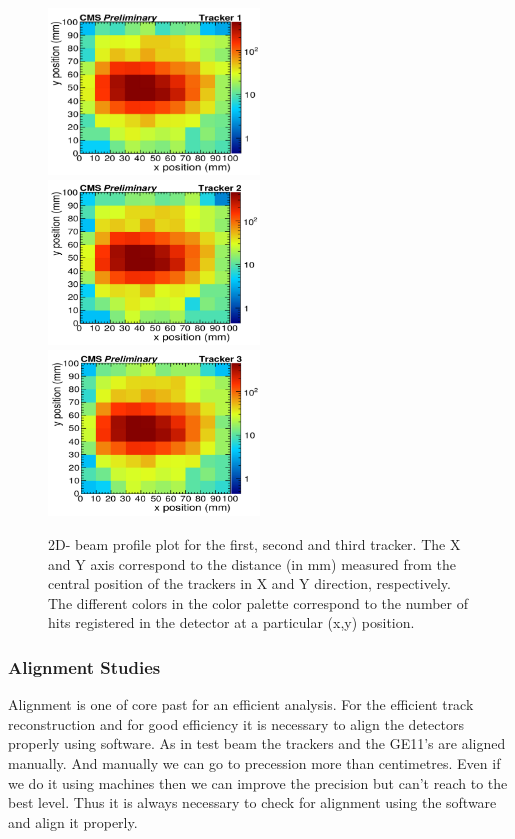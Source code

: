 \begin{figure}[!htbp]
\centering
\includegraphics[width=0.5\textwidth]{figures/GEM/Selection_027.png}%
\includegraphics[width=0.5\textwidth]{figures/GEM/Selection_028.png}\\
\includegraphics[width=0.5\textwidth]{figures/GEM/Selection_029.png}
\caption{2D- beam profile plot for the first, second and third tracker. The X and Y axis correspond to the distance (in mm) measured from the central position of the trackers in X and Y direction, respectively. The different colors in the color palette correspond to the number of hits registered in the detector at a particular (x,y) position.}\label{BeamProfile}
\end{figure}

\subsubsection{Alignment Studies}
Alignment is one of core past for an efficient analysis. 
For the efficient track reconstruction and for good efficiency it is necessary to align the detectors properly using software. 
As in test beam the trackers and the GE11's are aligned manually. 
And manually we can go to precession more than centimetres. 
Even if we do it using machines then we can improve the precision but can't reach to the best level. 
Thus it is always necessary to check for alignment using the software and align it properly.

